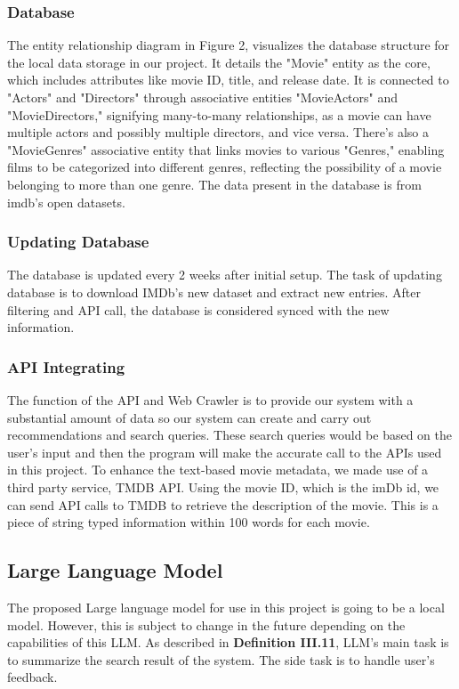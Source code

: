 \documentclass[journal]{IEEEtran}
\theoremstyle{mydefstyle}
\begin{document}
\subsubsection{Database}
The entity relationship diagram in Figure 2, visualizes the database structure for the local data storage in our project. It details the "Movie" entity as the core, which includes attributes like movie ID, title, and release date. It is connected to "Actors" and "Directors" through associative entities "MovieActors" and "MovieDirectors," signifying many-to-many relationships, as a movie can have multiple actors and possibly multiple directors, and vice versa. There's also a "MovieGenres" associative entity that links movies to various "Genres," enabling films to be categorized into different genres, reflecting the possibility of a movie belonging to more than one genre. The data present in the database is from imdb’s open datasets\cite{IMDb}. 

\subsubsection{Updating Database}
The database is updated every 2 weeks after initial setup. The task of updating database is to download IMDb's new dataset and extract new entries. After filtering and API call, the database is considered synced with the new information.

\subsubsection{API Integrating}
The function of the API and Web Crawler is to provide our system with a substantial amount of data so our system can create and carry out recommendations and search queries. These search queries would be based on the user’s input and then the program will make the accurate call to the APIs used in this project. To enhance the text-based movie metadata, we made use of a third party service, TMDB API. Using the movie ID, which is the imDb id, we can send API calls to TMDB to retrieve the description of the movie. This is a piece of string typed information within 100 words for each movie. 

\subsection{Large Language Model}
The proposed Large language model for use in this project is going to be a local model. However, this is subject to change in the future depending on the capabilities of this LLM. As described in \textbf{Definition III.11}, LLM's main task is to summarize the search result of the system. The side task is to handle user's feedback.
\end{document}

